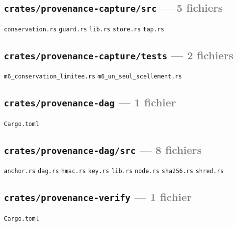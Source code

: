 \documentclass[10pt]{report}
\newcommand{\code}[1]{\texttt{\small #1}}
\begin{document}
\subsection*{\code{crates/provenance-capture/src} \normalfont\textcolor{grey}{--- 5 fichiers}}
\begin{sloppypar}\footnotesize\raggedright
\code{conservation.rs} \;\textbullet\; \code{guard.rs} \;\textbullet\; \code{lib.rs} \;\textbullet\; \code{store.rs} \;\textbullet\; \code{tap.rs}
\end{sloppypar}

\subsection*{\code{crates/provenance-capture/tests} \normalfont\textcolor{grey}{--- 2 fichiers}}
\begin{sloppypar}\footnotesize\raggedright
\code{m6\_conservation\_limitee.rs} \;\textbullet\; \code{m6\_un\_seul\_scellement.rs}
\end{sloppypar}

\subsection*{\code{crates/provenance-dag} \normalfont\textcolor{grey}{--- 1 fichier}}
\begin{sloppypar}\footnotesize\raggedright
\code{Cargo.toml}
\end{sloppypar}

\subsection*{\code{crates/provenance-dag/src} \normalfont\textcolor{grey}{--- 8 fichiers}}
\begin{sloppypar}\footnotesize\raggedright
\code{anchor.rs} \;\textbullet\; \code{dag.rs} \;\textbullet\; \code{hmac.rs} \;\textbullet\; \code{key.rs} \;\textbullet\; \code{lib.rs} \;\textbullet\; \code{node.rs} \;\textbullet\; \code{sha256.rs} \;\textbullet\; \code{shred.rs}
\end{sloppypar}

\subsection*{\code{crates/provenance-verify} \normalfont\textcolor{grey}{--- 1 fichier}}
\begin{sloppypar}\footnotesize\raggedright
\code{Cargo.toml}
\end{sloppypar}
\end{document}
